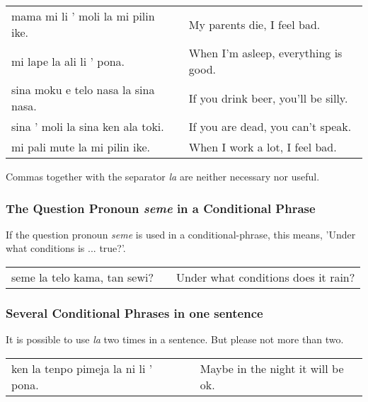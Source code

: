 \begin{supertabular}{p{5,5cm}|ll}
mama mi li ' moli la mi pilin ike. && My parents die, I feel bad. \\
mi lape la ali li ' pona. && When I'm asleep, everything is good. \\
sina moku e telo nasa la sina nasa. && If you drink beer, you'll be silly. \\
sina ' moli la sina ken ala toki. && If you are dead, you can't speak. \\
mi pali mute la mi pilin ike. && When I work a lot, I feel bad. \\
\end{supertabular} 

Commas together with the separator \textit{la} are neither necessary nor useful. 

%
%
\subsubsection*{The Question Pronoun \textit{seme} in a Conditional Phrase}
%
%

If the question pronoun \textit{seme} is used in a conditional-phrase, this means, 'Under what conditions is ... true?'.

\begin{supertabular}{p{5,5cm}|ll}
seme la telo kama, tan sewi? && Under what conditions does it rain? \\  
\end{supertabular} 

%
%
\subsubsection*{Several Conditional Phrases in one sentence}
%
%
It is possible to use \textit{la} two times in a sentence. 
But please not more than two. 

\begin{supertabular}{p{5,5cm}|ll}
ken la tenpo pimeja la ni li ' pona. && Maybe in the night it will be ok. \\  
\end{supertabular} 

